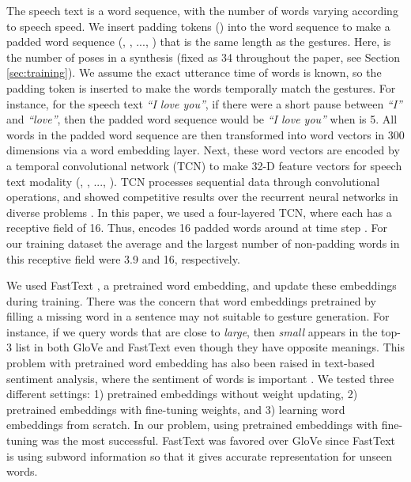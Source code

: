 \documentclass[acmtog]{acmart}
\begin{document}
The speech text is a word sequence, with the number of words varying according to speech speed. We insert padding tokens () into the word sequence to make a padded word sequence (, , ..., ) that is the same length as the gestures. Here,  is the number of poses in a synthesis (fixed as 34 throughout the paper, see Section \ref{sec:training}). We assume the exact utterance time of words is known, so the padding token is inserted to make the words temporally match the gestures. For instance, for the speech text \textit{``I love you''}, if there were a short pause between \textit{``I''} and \textit{``love''}, then the padded word sequence would be \textit{``I   love you''} when  is 5. All words in the padded word sequence are then transformed into word vectors in 300 dimensions via a word embedding layer. Next, these word vectors are encoded by a temporal convolutional network (TCN) \cite{BaiTCN2018} to make 32-D feature vectors for speech text modality (, , ..., ). TCN processes sequential data through convolutional operations, and showed competitive results over the recurrent neural networks in diverse problems \cite{BaiTCN2018}. In this paper, we used a four-layered TCN, where each  has a receptive field of 16. Thus,  encodes 16 padded words around at time step . For our training dataset the average and the largest number of non-padding words in this receptive field were 3.9 and 16, respectively. 

We used FastText \cite{bojanowski2016enriching}, a pretrained word embedding, and update these embeddings during training. There was the concern that word embeddings pretrained by filling a missing word in a sentence \cite{mikolov2013distributed} may not suitable to gesture generation. For instance, if we query words that are close to \textit{large}, then \textit{small} appears in the top-3 list in both GloVe \cite{pennington2014glove} and FastText \cite{bojanowski2016enriching} even though they have opposite meanings. This problem with pretrained word embedding has also been raised in text-based sentiment analysis, where the sentiment of words is important \cite{fu2018learning}. We tested three different settings: 1) pretrained embeddings without weight updating, 2) pretrained embeddings with fine-tuning weights, and 3) learning word embeddings from scratch. In our problem, using pretrained embeddings with fine-tuning was the most successful. FastText \cite{bojanowski2016enriching} was favored over GloVe \cite{pennington2014glove} since FastText is using subword information so that it gives accurate representation for unseen words.
\end{document}

